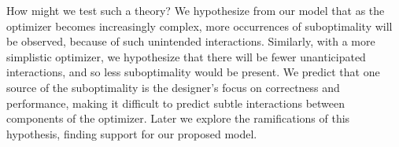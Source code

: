 How might we test such a theory? We hypothesize from our model that as
the optimizer becomes increasingly complex, more occurrences of
suboptimality will be observed, because of such unintended
interactions. Similarly, with a more simplistic optimizer, we
hypothesize that there will be fewer unanticipated interactions, and
so less suboptimality would be present. We predict that one source of
the suboptimality is the designer's focus on correctness and
performance, making it difficult to predict subtle interactions
between components of the optimizer. Later we explore the
ramifications of this hypothesis, finding support for our proposed
model.

